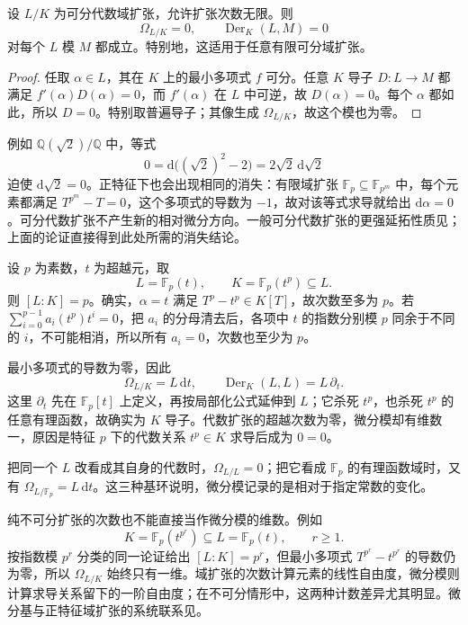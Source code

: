 \begin{corollary}\label{g5:cor:separable-field-differentials}
	设 \(L/K\) 为可分代数域扩张，允许扩张次数无限。则
	\[
		\Omega_{L/K}=0,\qquad
		\operatorname{Der}_K(L,M)=0
	\]
	对每个 \(L\) 模 \(M\) 都成立。特别地，这适用于任意有限可分域扩张。
\end{corollary}
\begin{proof}
	任取 \(\alpha\in L\)，其在 \(K\) 上的最小多项式 \(f\) 可分。任意 \(K\) 导子 \(D:L\to M\) 都满足 \(f'(\alpha)D(\alpha)=0\)，而 \(f'(\alpha)\) 在 \(L\) 中可逆，故 \(D(\alpha)=0\)。每个 \(\alpha\) 都如此，所以 \(D=0\)。特别取普遍导子；其像生成 \(\Omega_{L/K}\)，故这个模也为零。
\end{proof}

例如 \(\mathbb Q(\sqrt2)/\mathbb Q\) 中，等式
\[
	0=\mathrm{d}\bigl((\sqrt2)^2-2\bigr)
	=2\sqrt2\,\mathrm{d}\sqrt2
\]
迫使 \(\mathrm{d}\sqrt2=0\)。正特征下也会出现相同的消失：有限域扩张 \(\mathbb F_p\subseteq\mathbb F_{p^m}\) 中，每个元素都满足 \(T^{p^m}-T=0\)，这个多项式的导数为 \(-1\)，故对该等式求导就给出 \(\mathrm{d}\alpha=0\)。可分代数扩张不产生新的相对微分方向。一般可分代数扩张的更强延拓性质见\cite[第25节，定理25.3，第195--196页]{Matsumura1989}；上面的论证直接得到此处所需的消失结论。

\begin{example}\label{g5:exm:inseparable-field-differentials}
	设 \(p\) 为素数，\(t\) 为超越元，取
	\[
		L=\mathbb F_p(t),\qquad K=\mathbb F_p(t^p)\subseteq L.
	\]
	则 \([L:K]=p\)。确实，\(\alpha=t\) 满足 \(T^p-t^p\in K[T]\)，故次数至多为 \(p\)。若
	\(\sum_{i=0}^{p-1}a_i(t^p)t^i=0\)，把 \(a_i\) 的分母清去后，各项中 \(t\) 的指数分别模 \(p\) 同余于不同的 \(i\)，不可能相消，所以所有 \(a_i=0\)，次数也至少为 \(p\)。

	最小多项式的导数为零，因此
	\[
		\Omega_{L/K}=L\,\mathrm{d}t,\qquad
		\operatorname{Der}_K(L,L)=L\,\partial_t.
	\]
	这里 \(\partial_t\) 先在 \(\mathbb F_p[t]\) 上定义，再按局部化公式延伸到 \(L\)；它杀死 \(t^p\)，也杀死 \(t^p\) 的任意有理函数，故确实为 \(K\) 导子。代数扩张的超越次数为零，微分模却有维数一，原因是特征 \(p\) 下的代数关系 \(t^p\in K\) 求导后成为 \(0=0\)。

	把同一个 \(L\) 改看成其自身的代数时，\(\Omega_{L/L}=0\)；把它看成 \(\mathbb F_p\) 的有理函数域时，又有 \(\Omega_{L/\mathbb F_p}=L\,\mathrm{d}t\)。这三种基环说明，微分模记录的是相对于指定常数的变化。
\end{example}

纯不可分扩张的次数也不能直接当作微分模的维数。例如
\[
	K=\mathbb F_p(t^{p^r})\subseteq L=\mathbb F_p(t),\qquad r\geq1.
\]
按指数模 \(p^r\) 分类的同一论证给出 \([L:K]=p^r\)，但最小多项式 \(T^{p^r}-t^{p^r}\) 的导数仍为零，所以 \(\Omega_{L/K}\) 始终只有一维。域扩张的次数计算元素的线性自由度，微分模则计算求导关系留下的一阶自由度；在不可分情形中，这两种计数差异尤其明显。微分基与正特征域扩张的系统联系见\cite[第26节，微分基及定理26.5，第201--202页]{Matsumura1989}。
